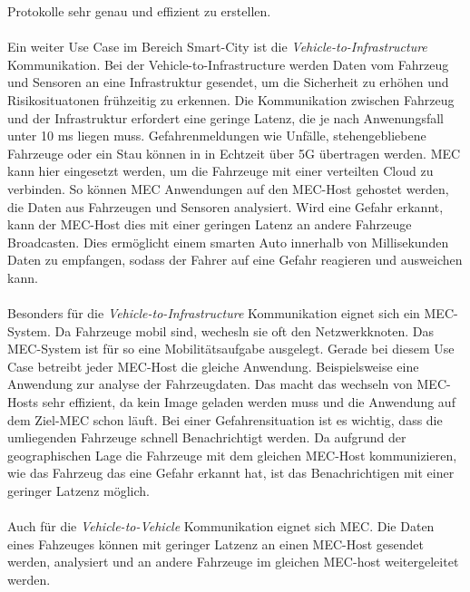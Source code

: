 \documentclass[runningheads]{llncs}
\numberwithin{figure}{section}
\begin{document}
Protokolle sehr genau und effizient zu erstellen.
\\
\\
Ein weiter Use Case im Bereich Smart-City ist die \textit{Vehicle-to-Infrastructure} Kommunikation.
Bei der Vehicle-to-Infrastructure werden Daten vom Fahrzeug und Sensoren an eine Infrastruktur gesendet, um die Sicherheit zu erhöhen und 
Risikosituatonen frühzeitig zu erkennen. 
Die Kommunikation zwischen Fahrzeug und der Infrastruktur erfordert eine geringe Latenz, 
die je nach Anwenungsfall unter 10 ms liegen muss. 
Gefahrenmeldungen wie Unfälle, stehengebliebene Fahrzeuge oder ein Stau können in in Echtzeit über 5G übertragen werden.
MEC kann hier eingesetzt werden, um die Fahrzeuge mit einer verteilten Cloud zu verbinden. So können MEC Anwendungen auf den MEC-Host 
gehostet werden, die Daten aus Fahrzeugen und Sensoren analysiert. Wird eine Gefahr erkannt, kann der MEC-Host dies mit einer
geringen Latenz an andere Fahrzeuge Broadcasten. 
Dies ermöglicht einem smarten Auto innerhalb von Millisekunden Daten zu empfangen, 
sodass der Fahrer auf eine Gefahr reagieren und ausweichen kann.
\\
\\
Besonders für die \textit{Vehicle-to-Infrastructure} Kommunikation eignet sich ein MEC-System. Da Fahrzeuge mobil sind, wechesln sie
oft den Netzwerkknoten. Das MEC-System ist für so eine Mobilitätsaufgabe ausgelegt. Gerade bei diesem Use Case betreibt 
jeder MEC-Host die gleiche Anwendung. Beispielsweise eine Anwendung zur analyse der Fahrzeugdaten. Das macht das wechseln von MEC-Hosts sehr effizient,
da kein Image geladen werden muss und die Anwendung auf dem Ziel-MEC schon läuft. Bei einer Gefahrensituation ist es wichtig, dass die
umliegenden Fahrzeuge schnell Benachrichtigt werden. Da aufgrund der geographischen Lage die Fahrzeuge mit dem gleichen MEC-Host
kommunizieren, wie das Fahrzeug das eine Gefahr erkannt hat, ist das Benachrichtigen mit einer geringer Latzenz möglich. 
\\
\\
Auch für die \textit{Vehicle-to-Vehicle} Kommunikation eignet sich MEC. Die Daten eines Fahzeuges können mit geringer Latzenz
an einen MEC-Host gesendet werden, analysiert und an andere Fahrzeuge im gleichen MEC-host weitergeleitet werden.
\end{document}

